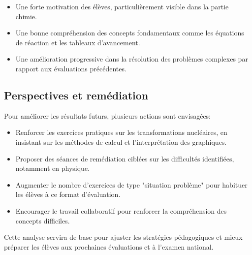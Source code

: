 \documentclass[12pt]{article}
\begin{document}
\begin{itemize}
    \item Une forte motivation des élèves, particulièrement visible dans la partie chimie.
    \item Une bonne compréhension des concepts fondamentaux comme les équations de réaction et les tableaux d'avancement.
    \item Une amélioration progressive dans la résolution des problèmes complexes par rapport aux évaluations précédentes.
\end{itemize}

\subsection{Perspectives et remédiation}
Pour améliorer les résultats futurs, plusieurs actions sont envisagées:

\begin{itemize}
    \item Renforcer les exercices pratiques sur les transformations nucléaires, en insistant sur les méthodes de calcul et l'interprétation des graphiques.
    \item Proposer des séances de remédiation ciblées sur les difficultés identifiées, notamment en physique.
    \item Augmenter le nombre d'exercices de type "situation problème" pour habituer les élèves à ce format d'évaluation.
    \item Encourager le travail collaboratif pour renforcer la compréhension des concepts difficiles.
\end{itemize}

Cette analyse servira de base pour ajuster les stratégies pédagogiques et mieux préparer les élèves aux prochaines évaluations et à l'examen national.
\end{document}

